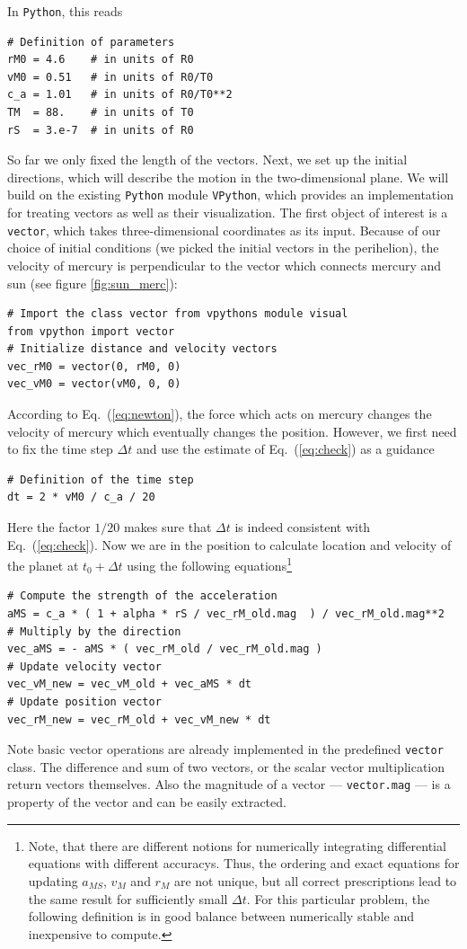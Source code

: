 \documentclass[12pt,ngerman,american]{iopart}
\newcommand{\python}[0]{\texttt{Python}}
\begin{document}
In \python{}, this reads
\begin{lstlisting}
# Definition of parameters
rM0 = 4.6    # in units of R0
vM0 = 0.51   # in units of R0/T0
c_a = 1.01   # in units of R0/T0**2
TM  = 88.    # in units of T0
rS  = 3.e-7  # in units of R0
\end{lstlisting}
So far we only fixed the length of the vectors.
Next, we set up the initial directions, which will describe the motion in the two-dimensional plane.  We will build on the existing \python{} module \texttt{VPython}, which provides an implementation for treating vectors as well as their visualization.
The first object of interest is a \texttt{vector}, which takes three-dimensional coordinates as its input.
Because of our choice of initial conditions (we picked the initial vectors in the perihelion), the velocity of mercury is perpendicular to the vector which connects mercury and sun (see figure \ref{fig:sun_merc}):
\begin{lstlisting}
# Import the class vector from vpythons module visual
from vpython import vector
# Initialize distance and velocity vectors
vec_rM0 = vector(0, rM0, 0)
vec_vM0 = vector(vM0, 0, 0)
\end{lstlisting}
According to Eq.~(\ref{eq:newton}), the force which acts on mercury changes the velocity of mercury which eventually changes the position.
However, we first need to fix the time step $\Delta t$ and use the estimate of Eq.~(\ref{eq:check}) as a guidance
\begin{lstlisting}
# Definition of the time step
dt = 2 * vM0 / c_a / 20
\end{lstlisting}
Here the factor $1/20$ makes sure that $\Delta t$ is indeed consistent with Eq.~(\ref{eq:check}).
Now we are in the position to calculate location and velocity of the planet at $t_0+\Delta t$ using the following equations\footnote{%
	Note, that there are different notions for numerically integrating differential equations with different accuracys.
	Thus, the ordering and exact equations for updating $a_{MS}$, $v_M$ and $r_M$ are not unique, but all correct prescriptions lead to the same result for sufficiently small $\Delta t$.
	For this particular problem, the following definition is in good balance between numerically stable and inexpensive to compute.
}%
\begin{lstlisting}
# Compute the strength of the acceleration
aMS = c_a * ( 1 + alpha * rS / vec_rM_old.mag  ) / vec_rM_old.mag**2
# Multiply by the direction
vec_aMS = - aMS * ( vec_rM_old / vec_rM_old.mag )
# Update velocity vector
vec_vM_new = vec_vM_old + vec_aMS * dt
# Update position vector
vec_rM_new = vec_rM_old + vec_vM_new * dt
\end{lstlisting}
Note basic vector operations are already implemented in the predefined \texttt{vector} class.
The difference and sum of two vectors, or the scalar vector multiplication return vectors themselves.
Also the magnitude of a vector --- \texttt{vector.mag} --- is a property of the vector and can be easily extracted.
\end{document}
